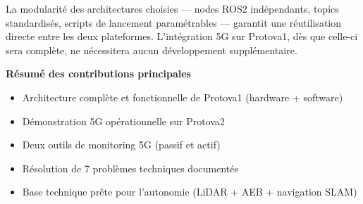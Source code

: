 \documentclass[a4paper,11pt]{article}
\begin{document}
La modularité des architectures choisies — nodes ROS2 indépendants, topics
standardisés, scripts de lancement paramétrables — garantit une réutilisation
directe entre les deux plateformes. L'intégration 5G sur Protova1, dès que celle-ci
sera complète, ne nécessitera aucun développement supplémentaire.

\vspace{1cm}

\begin{tcolorbox}[colback=lightblue, colframe=primary]
\textbf{Résumé des contributions principales}
\begin{itemize}[noitemsep]
  \item Architecture complète et fonctionnelle de Protova1 (hardware + software)
  \item Démonstration 5G opérationnelle sur Protova2
  \item Deux outils de monitoring 5G (passif et actif)
  \item Résolution de 7 problèmes techniques documentés
  \item Base technique prête pour l'autonomie (LiDAR + AEB + navigation SLAM)
\end{itemize}
\end{tcolorbox}
\end{document}
